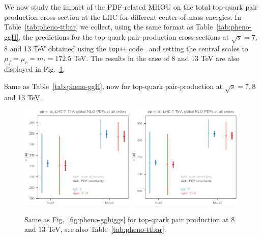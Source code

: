 We now study the impact of the PDF-related MHOU on the
total top-quark pair production cross-section at the LHC for
different center-of-mass energies.
In Table~\ref{tab:pheno-ttbar} we collect, using the same
format as Table~\ref{tab:pheno-ggH}, the  predictions
for the top-quark pair-production cross-sections at $\sqrt{s}=7$, 8 and 13 TeV
obtained using the {\tt top++} code~\cite{Czakon:2011xx} and setting
the central scales to $\mu_f=\mu_r=m_t=172.5$ TeV.
%
The results in the case of 8 and 13 TeV are also displayed in Fig.~\ref{fig:pheno-ttbar}.


\begin{table}[t]
	\centering
	\small
	
        \vspace*{3mm}
	\caption{\small
        Same as Table~\ref{tab:pheno-ggH}, now for
        top-quark pair-production at $\sqrt{s}=7,8$ and 13 TeV.}
	\label{tab:pheno-ttbar}
\end{table}

\begin{figure}[t]
  \begin{center}
    \includegraphics[width=0.49\textwidth]{mhous/plots/tt_8tev.pdf}
    \includegraphics[width=0.49\textwidth]{mhous/plots/tt_13tev.pdf}
    \caption{\small Same as Fig.~\ref{fig:pheno-gghiggs}
    for top-quark pair production at 8 and 13 TeV,
    see also Table~\ref{tab:pheno-ttbar}.
    \label{fig:pheno-ttbar} }
  \end{center}
\end{figure}


